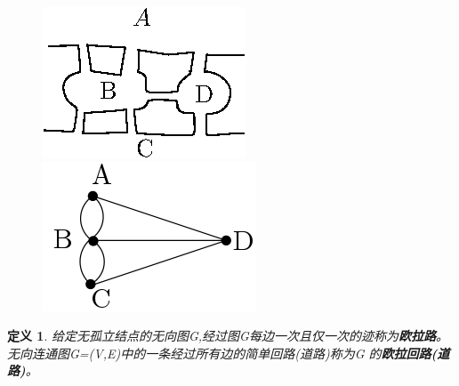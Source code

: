 \documentclass[11pt,a4paper,openany]{book}
\newtheorem{defination}{\textbf{定义}}[section]
\begin{document}
\begin{figure}[h]
  \centering
  \vspace{-10pt}
  \begin{minipage}[!ht]{.35\linewidth}
  \includegraphics[width=1.0\linewidth]{2_8.eps}
  \caption{}
  \end{minipage}
  \begin{minipage}[!ht]{.35\linewidth}
   \includegraphics[width=1.0\linewidth]{2.9.png}
  \caption{}
  \end{minipage}
  \vspace{-25pt}
\end{figure}
\begin{defination}\K
给定无孤立结点的无向图G,经过图G每边一次且仅一次的迹称为\textbf{欧拉路}。无向连通图G=(V,E)中的一条经过所有边的简单回路(道路)称为G 的\textbf{欧拉回路(道路)}。
\end{defination}
\end{document}
